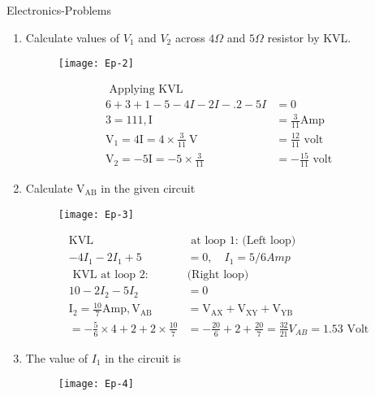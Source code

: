 \begin{abox}
	Electronics-Problems
	\end{abox}
\begin{enumerate}
	\item Calculate values of $V_{1}$ and $V_{2}$ across $4 \Omega$ and $5 \Omega$ resistor by KVL.
	\begin{figure}[H]
		\centering
		\texttt{[image: Ep-2]}
	\end{figure}
	\begin{answer}
		\begin{align*}
		\text { Applying KVL }\\
		6+3+1-5-4 I-2 I-.2-5 I&=0\\
		3=111, \mathrm{I}&=\frac{3}{11} \mathrm{Amp}\\
		\mathrm{V}_{\mathrm{1}}=4 \mathrm{I}=4 \times \frac{3}{11} \mathrm{~V}&=\frac{12}{11} \text { volt }\\
		\mathrm{V}_{2}=-5 \mathrm{I}=-5 \times \frac{3}{11}&=-\frac{15}{11} \text { volt }
		\end{align*}
	\end{answer}
	\item Calculate $\mathrm{V}_{\mathrm{AB}}$ in the given circuit
	\begin{figure}[H]
		\centering
		\texttt{[image: Ep-3]}
	\end{figure}
	\begin{answer}
		\begin{align*}
		\mathrm{KVL} &\text { at loop 1: (Left loop) }\\
		-4 I_{1}-2 I_{1}+5&=0, \quad I_{1}=5 / 6 A m p\\
		\text { KVL at loop 2: }&\text{(Right loop) }\\
		10-2 I_{2}-5 I_{2}&=0\\
		\mathrm{I}_{2}=\frac{10}{7} \mathrm{Amp}, \mathrm{V}_{\mathrm{AB}}&=\mathrm{V}_{\mathrm{AX}}+\mathrm{V}_{\mathrm{XY}}+\mathrm{V}_{\mathrm{YB}}\\
		=-\frac{5}{6} \times 4+2+2 \times \frac{10}{7}&=-\frac{20}{6}+2+\frac{20}{7}=\frac{32}{21} V_{A B}=1.53 \text { Volt }
		\end{align*}
	\end{answer}
	\item The value of $I_{1}$ in the circuit is
	\begin{figure}[H]
		\centering
		\texttt{[image: Ep-4]}
	\end{figure}
	\begin{answer}$\left. \right. $

\end{answer}
\end{enumerate}
